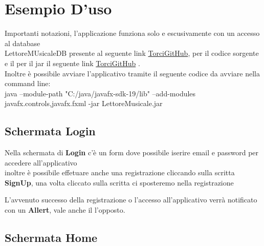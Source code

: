 \documentclass[11pt]{article}
\begin{document}
	\clearpage
	\section{Esempio D'uso}
	Importanti notazioni, l'applicazione funziona solo e escusivamente con un accesso al database \\
	LettoreMUsicaleDB presente al seguente link \href{https://github.com/torcy-it/PROGETTO-BD-OO}{TorciGitHub}, per il codice sorgente e il per il jar il seguente link \href{https://github.com/torcy-it/LettoreMusicale/tree/main/src}{TorciGitHub} .\\
	Inoltre è possibile avviare l'applicativo tramite il seguente codice da avviare nella command line:\\
	java --module-path "C:/java/javafx-sdk-19/lib" --add-modules javafx.controls,javafx.fxml -jar LettoreMusicale.jar

	\subsection{Schermata Login}

	Nella schermata di \textbf{Login} c'è un form dove possibile iserire email e password per accedere all'applicativo \\
	inoltre è possibile effetuare anche una registrazione cliccando sulla scritta \textbf{SignUp}, una volta cliccato sulla scritta ci sposteremo nella registrazione
	\begin{figure}[h]
		\centering
		
	\end{figure}
	L'avvenuto successo della registrazione o l'accesso all'applicativo verrà notificato con un \textbf{Allert}, vale anche il l'opposto.
	\begin{figure}[h]
		\centering
		
	\end{figure}
	\clearpage
	\subsection{Schermata Home}
\end{document}
